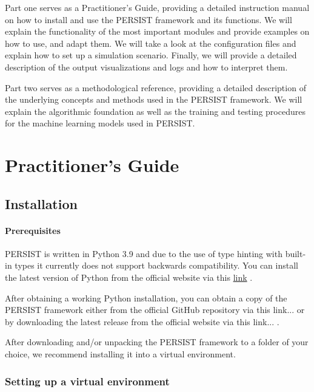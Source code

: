 \documentclass[
	a4paper, %
	12pt, %
]{persist}
\begin{document}
Part one serves as a Practitioner's Guide, providing a detailed instruction manual on how to install and use the PERSIST framework and its functions. We will explain the functionality of the most important modules and provide examples on how to use, and adapt them. We will take a look at the configuration files and explain how to set up a simulation scenario. Finally, we will provide a detailed description of the output visualizations and logs and how to interpret them.

Part two serves as a methodological reference, providing a detailed description of the underlying concepts and methods used in the PERSIST framework. We will explain the algorithmic foundation as well as the training and testing procedures for the machine learning models used in PERSIST.

\section{Practitioner's Guide}

\subsection{Installation}

\paragraph{Prerequisites}

PERSIST is written in Python 3.9 and due to the use of type hinting with built-in types it currently does not support backwards compatibility. You can install the latest version of Python from the official website via this \href{https://www.python.org/downloads/}{link} \ExternalLink.

After obtaining a working Python installation, you can obtain a copy of the PERSIST framework either from the official GitHub repository via this link... \ExternalLink or by downloading the latest release from the official website via this link... \ExternalLink.

After downloading and/or unpacking the PERSIST framework to a folder of your choice, we recommend installing it into a virtual environment.

\subsubsection{Setting up a virtual environment}
\end{document}
